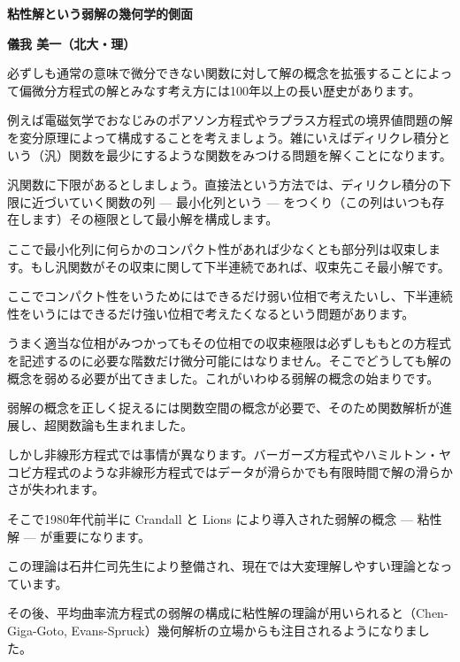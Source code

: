 \documentclass[uplatex,dvipdfmx]{jlreq}
\begin{document}
\begin{center}
{\large\bfseries 粘性解という弱解の幾何学的側面}
\end{center}

\begin{flushright}
\textbf{儀我 美一（北大・理）}
\end{flushright}

必ずしも通常の意味で微分できない関数に対して解の概念を拡張することによって偏微分方程式の解とみなす考え方には100年以上の長い歴史があります。

例えば電磁気学でおなじみのポアソン方程式やラプラス方程式の境界値問題の解を変分原理によって構成することを考えましょう。雑にいえばディリクレ積分という（汎）関数を最少にするような関数をみつける問題を解くことになります。

汎関数に下限があるとしましょう。直接法という方法では、ディリクレ積分の下限に近づいていく関数の列 --- 最小化列という --- をつくり（この列はいつも存在します）その極限として最小解を構成します。

ここで最小化列に何らかのコンパクト性があれば少なくとも部分列は収束します。もし汎関数がその収束に関して下半連続であれば、収束先こそ最小解です。

ここでコンパクト性をいうためにはできるだけ弱い位相で考えたいし、下半連続性をいうにはできるだけ強い位相で考えたくなるという問題があります。

うまく適当な位相がみつかってもその位相での収束極限は必ずしももとの方程式を記述するのに必要な階数だけ微分可能にはなりません。そこでどうしても解の概念を弱める必要が出てきました。これがいわゆる弱解の概念の始まりです。

弱解の概念を正しく捉えるには関数空間の概念が必要で、そのため関数解析が進展し、超関数論も生まれました。

しかし非線形方程式では事情が異なります。バーガーズ方程式やハミルトン・ヤコビ方程式のような非線形方程式ではデータが滑らかでも有限時間で解の滑らかさが失われます。

そこで1980年代前半に Crandall と Lions により導入された弱解の概念 --- 粘性解 --- が重要になります。

この理論は石井仁司先生により整備され、現在では大変理解しやすい理論となっています。

その後、平均曲率流方程式の弱解の構成に粘性解の理論が用いられると（Chen-Giga-Goto, Evans-Spruck）幾何解析の立場からも注目されるようになりました。
\end{document}
